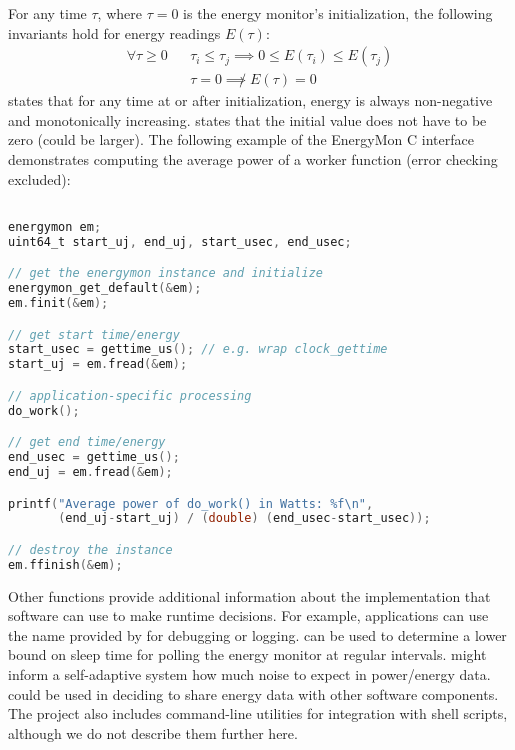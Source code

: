 For any time $\tau$, where $\tau=0$ is the energy monitor's initialization, the following invariants hold for energy readings $E(\tau)$:
\begin{eqnarray}
  \forall \tau \ge 0 && \tau_i \le \tau_j \implies 0 \le E(\tau_i) \le E(\tau_j) \label{eqn:energy-monotonic} \\
  && \tau = 0 \not \implies E(\tau) = 0 \label{eqn:energy-time-zero}
\end{eqnarray}
 states that for any time at or after initialization, energy is always non-negative and monotonically increasing.
 states that the initial value does not have to be zero (could be larger).
The following example of the EnergyMon C interface demonstrates computing the average power of a worker function (error checking excluded):
%
\begin{lstlisting}[language=C,%
  caption={Reading energy values and computing power with EnergyMon.},%
  morekeywords={uint64_t},%
  label={lst:energymon-example}]%

energymon em;
uint64_t start_uj, end_uj, start_usec, end_usec;

// get the energymon instance and initialize
energymon_get_default(&em);
em.finit(&em);

// get start time/energy
start_usec = gettime_us(); // e.g. wrap clock_gettime
start_uj = em.fread(&em);

// application-specific processing
do_work();

// get end time/energy
end_usec = gettime_us();
end_uj = em.fread(&em);

printf("Average power of do_work() in Watts: %f\n",
       (end_uj-start_uj) / (double) (end_usec-start_usec));

// destroy the instance
em.ffinish(&em);
\end{lstlisting}
Other functions provide additional information about the implementation that software can use to make runtime decisions.
For example, applications can use the name provided by  for debugging or logging.
 can be used to determine a lower bound on sleep time for polling the energy monitor at regular intervals.
 might inform a self-adaptive system how much noise to expect in power/energy data.
 could be used in deciding to share energy data with other software components.
The project also includes command-line utilities for integration with shell scripts, although we do not describe them further here.

